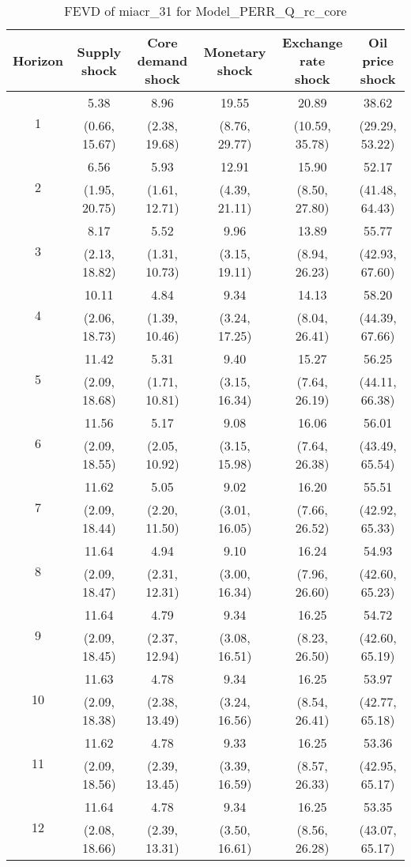 \documentclass{article}
\begin{document}
\begin{table}
	\footnotesize
	\caption{FEVD of miacr_31 for Model_PERR_Q_rc_core}
	\begin{tabular}{cccccc}
		Horizon & Supply shock & Core demand shock & Monetary shock & Exchange rate shock & Oil price shock\\ \hline
		\multirow{2}{*}{1} & 5.38 & 8.96 & 19.55 & 20.89 & 38.62\\
		 & (0.66, 15.67) & (2.38, 19.68) & (8.76, 29.77) & (10.59, 35.78) & (29.29, 53.22)\\
		\multirow{2}{*}{2} & 6.56 & 5.93 & 12.91 & 15.90 & 52.17\\
		 & (1.95, 20.75) & (1.61, 12.71) & (4.39, 21.11) & (8.50, 27.80) & (41.48, 64.43)\\
		\multirow{2}{*}{3} & 8.17 & 5.52 & 9.96 & 13.89 & 55.77\\
		 & (2.13, 18.82) & (1.31, 10.73) & (3.15, 19.11) & (8.94, 26.23) & (42.93, 67.60)\\
		\multirow{2}{*}{4} & 10.11 & 4.84 & 9.34 & 14.13 & 58.20\\
		 & (2.06, 18.73) & (1.39, 10.46) & (3.24, 17.25) & (8.04, 26.41) & (44.39, 67.66)\\
		\multirow{2}{*}{5} & 11.42 & 5.31 & 9.40 & 15.27 & 56.25\\
		 & (2.09, 18.68) & (1.71, 10.81) & (3.15, 16.34) & (7.64, 26.19) & (44.11, 66.38)\\
		\multirow{2}{*}{6} & 11.56 & 5.17 & 9.08 & 16.06 & 56.01\\
		 & (2.09, 18.55) & (2.05, 10.92) & (3.15, 15.98) & (7.64, 26.38) & (43.49, 65.54)\\
		\multirow{2}{*}{7} & 11.62 & 5.05 & 9.02 & 16.20 & 55.51\\
		 & (2.09, 18.44) & (2.20, 11.50) & (3.01, 16.05) & (7.66, 26.52) & (42.92, 65.33)\\
		\multirow{2}{*}{8} & 11.64 & 4.94 & 9.10 & 16.24 & 54.93\\
		 & (2.09, 18.47) & (2.31, 12.31) & (3.00, 16.34) & (7.96, 26.60) & (42.60, 65.23)\\
		\multirow{2}{*}{9} & 11.64 & 4.79 & 9.34 & 16.25 & 54.72\\
		 & (2.09, 18.45) & (2.37, 12.94) & (3.08, 16.51) & (8.23, 26.50) & (42.60, 65.19)\\
		\multirow{2}{*}{10} & 11.63 & 4.78 & 9.34 & 16.25 & 53.97\\
		 & (2.09, 18.38) & (2.38, 13.49) & (3.24, 16.56) & (8.54, 26.41) & (42.77, 65.18)\\
		\multirow{2}{*}{11} & 11.62 & 4.78 & 9.33 & 16.25 & 53.36\\
		 & (2.09, 18.56) & (2.39, 13.45) & (3.39, 16.59) & (8.57, 26.33) & (42.95, 65.17)\\
		\multirow{2}{*}{12} & 11.64 & 4.78 & 9.34 & 16.25 & 53.35\\
		 & (2.08, 18.66) & (2.39, 13.31) & (3.50, 16.61) & (8.56, 26.28) & (43.07, 65.17)\\
	\end{tabular}
\label{tab:fevd-Model_PERR_Q_rc_core-miacr_31}
\end{table}
\end{document}
